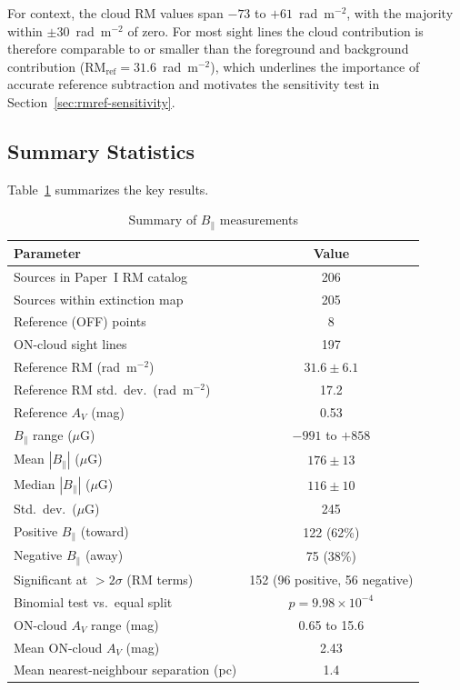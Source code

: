 \documentclass[twocolumn]{aastex701}
\begin{document}

For context, the cloud RM values span $-73$ to $+61$~rad~m$^{-2}$, with the
majority within $\pm 30$~rad~m$^{-2}$ of zero. For most sight lines the cloud
contribution is therefore comparable to or smaller than the foreground and
background contribution ($\mathrm{RM_{ref}} = 31.6$~rad~m$^{-2}$), which
underlines the importance of accurate reference subtraction and motivates the
sensitivity test in Section~\ref{sec:rmref-sensitivity}.

\subsection{Summary Statistics}

Table~\ref{tab:summary} summarizes the key results.

\begin{table}[t]
\centering
\caption{Summary of $B_\parallel$ measurements}
\label{tab:summary}
\begin{tabular}{lc}
\toprule
Parameter & Value \\
\midrule
Sources in Paper~I RM catalog & 206 \\
Sources within extinction map & 205 \\
Reference (OFF) points & 8 \\
ON-cloud sight lines & 197 \\
\midrule
Reference RM (rad~m$^{-2}$) & $31.6 \pm 6.1$ \\
Reference RM std.\ dev.\ (rad~m$^{-2}$) & 17.2 \\
Reference $A_V$ (mag) & 0.53 \\
\midrule
$B_\parallel$ range ($\mu$G) & $-991$ to $+858$ \\
Mean $|B_\parallel|$ ($\mu$G) & $176 \pm 13$ \\
Median $|B_\parallel|$ ($\mu$G) & $116 \pm 10$ \\
Std.\ dev.\ ($\mu$G) & 245 \\
\midrule
Positive $B_\parallel$ (toward) & 122 (62\%) \\
Negative $B_\parallel$ (away) & 75 (38\%) \\
Significant at $>2\sigma$ (RM terms) & 152 (96 positive, 56 negative) \\
Binomial test vs.\ equal split & $p=9.98\times10^{-4}$ \\
\midrule
ON-cloud $A_V$ range (mag) & 0.65 to 15.6 \\
Mean ON-cloud $A_V$ (mag) & 2.43 \\
Mean nearest-neighbour separation (pc) & 1.4 \\
\bottomrule
\end{tabular}
\end{table}
\end{document}
